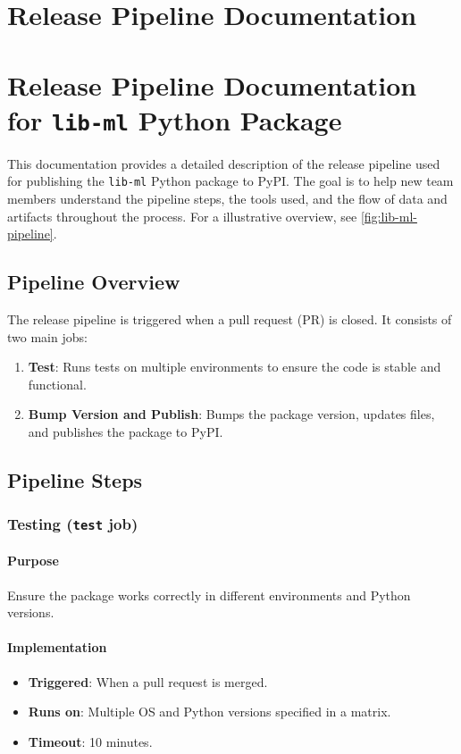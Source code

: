 \section{Release Pipeline Documentation}
\section*{Release Pipeline Documentation for \texttt{lib-ml} Python Package}

This documentation provides a detailed description of the release pipeline used for publishing the \texttt{lib-ml} Python package to PyPI. The goal is to help new team members understand the pipeline steps, the tools used, and the flow of data and artifacts throughout the process. For a illustrative overview, see \autoref{fig:lib-ml-pipeline}.

\subsection{Pipeline Overview}

The release pipeline is triggered when a pull request (PR) is closed. It consists of two main jobs:

\begin{enumerate}
    \item \textbf{Test}: Runs tests on multiple environments to ensure the code is stable and functional.
    \item \textbf{Bump Version and Publish}: Bumps the package version, updates files, and publishes the package to PyPI.
\end{enumerate}

\subsection{Pipeline Steps}

\subsubsection{Testing (\texttt{test} job)}

\paragraph{Purpose}
Ensure the package works correctly in different environments and Python versions.

\paragraph{Implementation}
\begin{itemize}
    \item \textbf{Triggered}: When a pull request is merged.
    \item \textbf{Runs on}: Multiple OS and Python versions specified in a matrix.
    \item \textbf{Timeout}: 10 minutes.
\end{itemize}

